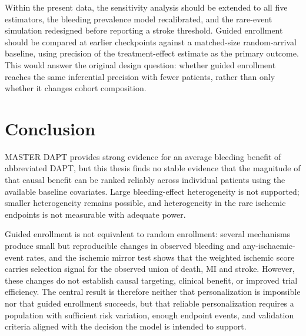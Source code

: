 Within the present data, the sensitivity analysis should be extended to all five
estimators, the bleeding prevalence model recalibrated, and the rare-event simulation
redesigned before reporting a stroke threshold. Guided enrollment should be compared at
earlier checkpoints against a matched-size random-arrival baseline, using precision of
the treatment-effect estimate as the primary outcome. This would answer the original
design question: whether guided enrollment reaches the same inferential precision with
fewer patients, rather than only whether it changes cohort composition.

\section{Conclusion}

MASTER DAPT provides strong evidence for an average bleeding benefit of abbreviated DAPT,
but this thesis finds no stable evidence that the magnitude of that causal benefit can be
ranked reliably across individual patients using the available baseline covariates. Large
bleeding-effect heterogeneity is not supported; smaller heterogeneity remains possible,
and heterogeneity in the rare ischemic endpoints is not measurable with adequate power.

\vspace{10pt}

Guided enrollment is not equivalent to random enrollment: several mechanisms produce
small but reproducible changes in observed bleeding and any-ischaemic-event rates, and
the ischemic mirror test shows that the weighted ischemic score carries selection signal
for the observed union of death, MI and stroke. However, these changes do not establish
causal targeting, clinical benefit, or improved trial efficiency. The central result is
therefore neither that personalization is impossible nor that guided enrollment succeeds,
but that reliable personalization requires a population with sufficient risk variation,
enough endpoint events, and validation criteria aligned with the decision the model is
intended to support.
